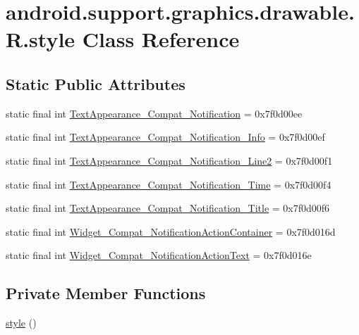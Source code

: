 \hypertarget{classandroid_1_1support_1_1graphics_1_1drawable_1_1_r_1_1style}{}\section{android.\+support.\+graphics.\+drawable.\+R.\+style Class Reference}
\label{classandroid_1_1support_1_1graphics_1_1drawable_1_1_r_1_1style}
\subsection*{Static Public Attributes}
\begin{DoxyCompactItemize}
\item 
static final int \mbox{\hyperlink{classandroid_1_1support_1_1graphics_1_1drawable_1_1_r_1_1style_a2848fcbad5c98c38e4e64cd2935e6a14}{Text\+Appearance\+\_\+\+Compat\+\_\+\+Notification}} = 0x7f0d00ee
\item 
static final int \mbox{\hyperlink{classandroid_1_1support_1_1graphics_1_1drawable_1_1_r_1_1style_aa8eefa0569ad79dfe00f04b35efbc84a}{Text\+Appearance\+\_\+\+Compat\+\_\+\+Notification\+\_\+\+Info}} = 0x7f0d00ef
\item 
static final int \mbox{\hyperlink{classandroid_1_1support_1_1graphics_1_1drawable_1_1_r_1_1style_aa59e9e1cfdaa67f8bef74123f7d4fafd}{Text\+Appearance\+\_\+\+Compat\+\_\+\+Notification\+\_\+\+Line2}} = 0x7f0d00f1
\item 
static final int \mbox{\hyperlink{classandroid_1_1support_1_1graphics_1_1drawable_1_1_r_1_1style_a1c6cd73cd6d4007e927a6baf754b1969}{Text\+Appearance\+\_\+\+Compat\+\_\+\+Notification\+\_\+\+Time}} = 0x7f0d00f4
\item 
static final int \mbox{\hyperlink{classandroid_1_1support_1_1graphics_1_1drawable_1_1_r_1_1style_a355c96253e0416e6f38c0b82099e8f56}{Text\+Appearance\+\_\+\+Compat\+\_\+\+Notification\+\_\+\+Title}} = 0x7f0d00f6
\item 
static final int \mbox{\hyperlink{classandroid_1_1support_1_1graphics_1_1drawable_1_1_r_1_1style_a1d8f04477885f72e43116dd03c334cfd}{Widget\+\_\+\+Compat\+\_\+\+Notification\+Action\+Container}} = 0x7f0d016d
\item 
static final int \mbox{\hyperlink{classandroid_1_1support_1_1graphics_1_1drawable_1_1_r_1_1style_a490bf3c12ac2da8140c682ca1cda94ed}{Widget\+\_\+\+Compat\+\_\+\+Notification\+Action\+Text}} = 0x7f0d016e
\end{DoxyCompactItemize}
\subsection*{Private Member Functions}
\begin{DoxyCompactItemize}
\item 
\mbox{\hyperlink{classandroid_1_1support_1_1graphics_1_1drawable_1_1_r_1_1style_af5795d938f7c83883b5bd590498e3cd3}{style}} ()
\end{DoxyCompactItemize}


